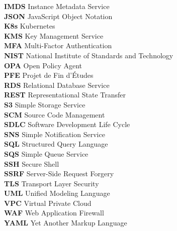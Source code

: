 \begin{tabbing}
\textbf{IMDS}       \> Instance Metadata Service \\[4pt]
\textbf{JSON}       \> JavaScript Object Notation \\[4pt]
\textbf{K8s}        \> Kubernetes \\[4pt]
\textbf{KMS}        \> Key Management Service \\[4pt]
\textbf{MFA}        \> Multi-Factor Authentication \\[4pt]
\textbf{NIST}       \> National Institute of Standards and Technology \\[4pt]
\textbf{OPA}        \> Open Policy Agent \\[4pt]
\textbf{PFE}        \> Projet de Fin d'Études \\[4pt]
\textbf{RDS}        \> Relational Database Service \\[4pt]
\textbf{REST}       \> Representational State Transfer \\[4pt]
\textbf{S3}         \> Simple Storage Service \\[4pt]
\textbf{SCM}        \> Source Code Management \\[4pt]
\textbf{SDLC}       \> Software Development Life Cycle \\[4pt]
\textbf{SNS}        \> Simple Notification Service \\[4pt]
\textbf{SQL}        \> Structured Query Language \\[4pt]
\textbf{SQS}        \> Simple Queue Service \\[4pt]
\textbf{SSH}        \> Secure Shell \\[4pt]
\textbf{SSRF}       \> Server-Side Request Forgery \\[4pt]
\textbf{TLS}        \> Transport Layer Security \\[4pt]
\textbf{UML}        \> Unified Modeling Language \\[4pt]
\textbf{VPC}        \> Virtual Private Cloud \\[4pt]
\textbf{WAF}        \> Web Application Firewall \\[4pt]
\textbf{YAML}       \> Yet Another Markup Language \\[4pt]
\end{tabbing}
